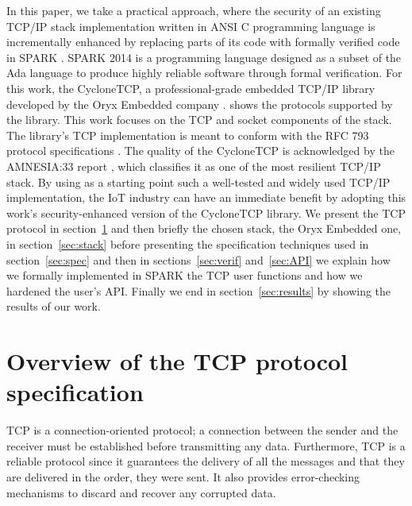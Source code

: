 \documentclass[conference]{IEEEtran}
\begin{document}
In this paper, we take a practical approach, where the security of an existing TCP/IP stack implementation written in ANSI C programming language is incrementally enhanced by replacing parts of its code with formally verified code in SPARK \cite{mccormick_chapin_2015}. SPARK 2014 is a programming language designed as a subset of the Ada language to produce highly reliable software through formal verification. For this work, the CycloneTCP, a professional-grade embedded TCP/IP library developed by the Oryx Embedded company \cite{CycloneTCP}.  shows the protocols supported by the library. This work focuses on the TCP and socket components of the stack. The library's TCP implementation is meant to conform with the RFC 793 protocol specifications \cite{rfc793}. The quality of the CycloneTCP is acknowledged by the AMNESIA:33 report \cite{AMNESIA33}, which classifies it as one of the most resilient TCP/IP stack. By using as a starting point such a well-tested and widely used TCP/IP implementation, the IoT industry can have an immediate benefit by adopting this work's security-enhanced version of the CycloneTCP library. 
We present the TCP protocol in section~\ref{sec:TCP} and then briefly the
chosen stack, the Oryx Embedded one, in section~\ref{sec:stack}
before presenting the specification techniques used in section~\ref{sec:spec}
and then in sections~\ref{sec:verif} and~\ref{sec:API} we explain how we
formally implemented in SPARK the TCP user functions and how we hardened the
user's API. Finally we end in section~\ref{sec:results} by showing the results
of our work.

\section{Overview of the TCP protocol specification}
\label{sec:TCP}



TCP is a connection-oriented protocol; a connection between the sender and the receiver must be established before transmitting any data. Furthermore, TCP is a reliable protocol since it guarantees the delivery of all the messages and that they are delivered in the order, they were sent. It also provides error-checking mechanisms to discard and recover any corrupted data.

\end{document}
